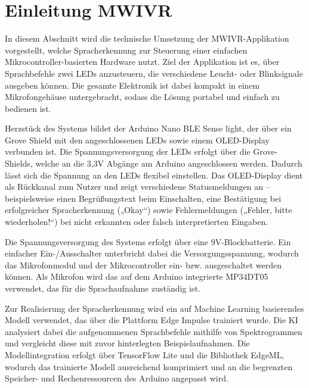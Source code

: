 %
%
%


\chapter{Einleitung MWIVR} \label{sec:Einleitung-Anwendung}

In diesem Abschnitt wird die technische Umsetzung der MWIVR-Applikation vorgestellt, welche Spracherkennung zur Steuerung einer einfachen Mikrocontroller-basierten Hardware nutzt. Ziel der Applikation ist es, über Sprachbefehle zwei LEDs anzusteuern, die verschiedene Leucht- oder Blinksignale ausgeben können. Die gesamte Elektronik ist dabei kompakt in einem Mikrofongehäuse untergebracht, sodass die Lösung portabel und einfach zu bedienen ist.

\bigskip

Herzstück des Systems bildet der Arduino Nano BLE Sense light, der über ein Grove Shield mit den angeschlossenen LEDs sowie einem OLED-Display verbunden ist. Die Spannungsversorgung der LEDs erfolgt über die Grove-Shields, welche an die 3,3V Abgänge am Arduino angeschlossen werden. Dadurch lässt sich die Spannung an den LEDs flexibel einstellen. Das OLED-Display dient als Rückkanal zum Nutzer und zeigt verschiedene Statusmeldungen an – beispielsweise einen Begrüßungstext beim Einschalten, eine Bestätigung bei erfolgreicher Spracherkennung („Okay“) sowie Fehlermeldungen („Fehler, bitte wiederholen!“) bei nicht erkannten oder falsch interpretierten Eingaben.

\bigskip

Die Spannungsversorgung des Systems erfolgt über eine 9V-Blockbatterie. Ein einfacher Ein-/Ausschalter unterbricht dabei die Versorgungsspannung, wodurch das Mikrofonmodul und der Mikrocontroller ein- bzw. ausgeschaltet werden können. Als Mikrofon wird das auf dem Arduino integrierte MP34DT05 verwendet, das für die Sprachaufnahme zuständig ist.

\bigskip

Zur Realisierung der Spracherkennung wird ein auf Machine Learning basierendes Modell verwendet, das über die Plattform Edge Impulse trainiert wurde. Die KI analysiert dabei die aufgenommenen Sprachbefehle mithilfe von Spektrogrammen und vergleicht diese mit zuvor hinterlegten Beispielaufnahmen. Die Modellintegration erfolgt über TensorFlow Lite und die Bibliothek EdgeML, wodurch das trainierte Modell ausreichend komprimiert und an die begrenzten Speicher- und Rechenressourcen des Arduino angepasst wird.

